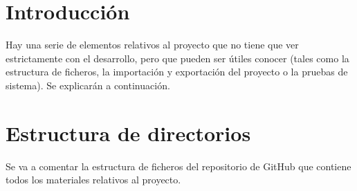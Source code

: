 
\section{Introducción}
Hay una serie de elementos relativos al proyecto que no tiene que ver estrictamente con el desarrollo, pero que pueden ser útiles conocer (tales como la estructura de ficheros, la importación y exportación del proyecto o la pruebas de sistema). Se explicarán a continuación. 

\section{Estructura de directorios}
Se va a comentar la estructura de ficheros del repositorio de GitHub que contiene todos los materiales relativos al proyecto.

